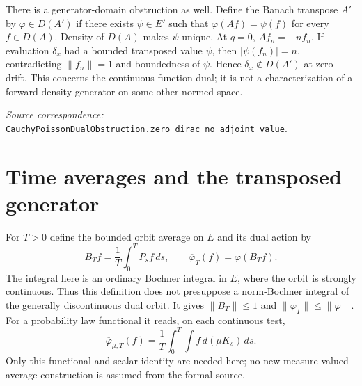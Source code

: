 \documentclass[11pt]{article}
\newcommand{\code}[1]{{\small\nolinkurl{#1}}}
\begin{document}
There is a generator-domain obstruction as well. Define the Banach
transpose $A'$ by $\varphi\in D(A')$ if there exists $\psi\in E'$
such that $\varphi(Af)=\psi(f)$ for every $f\in D(A)$. Density of
$D(A)$ makes $\psi$ unique. At $q=0$, $Af_n=-nf_n$. If evaluation
$\delta_x$ had a bounded transposed value $\psi$, then
$|\psi(f_n)|=n$, contradicting $\|f_n\|=1$ and boundedness of $\psi$.
Hence $\delta_x\notin D(A')$ at zero drift. This concerns the
continuous-function dual; it is not a characterization of a forward
density generator on some other normed space.
\par\smallskip\begingroup\small\raggedright
\textit{Source correspondence:} \code{CauchyPoissonDualObstruction.zero_dirac_no_adjoint_value}.
\par\endgroup

\section{Time averages and the transposed generator}
For $T>0$ define the bounded orbit average on $E$ and its dual action by
\begin{equation}\label{eq:dualavg}
 B_Tf=\frac1T\int_0^TP_sf\,ds,\qquad
 \overline\varphi_T(f)=\varphi(B_Tf).
\end{equation}
The integral here is an ordinary Bochner integral in $E$, where the
orbit is strongly continuous. Thus this definition does not presuppose
a norm-Bochner integral of the generally discontinuous dual orbit.
It gives $\|B_T\|\leq1$ and $\|\overline\varphi_T\|\leq\|\varphi\|$.
For a probability law functional it reads, on each continuous test,
\[
 \overline\varphi_{\mu,T}(f)
      =\frac1T\int_0^T\int f\,d(\mu K_s)\,ds.
\]
Only this functional and scalar identity are needed here; no new
measure-valued average construction is assumed from the formal source.
\end{document}
